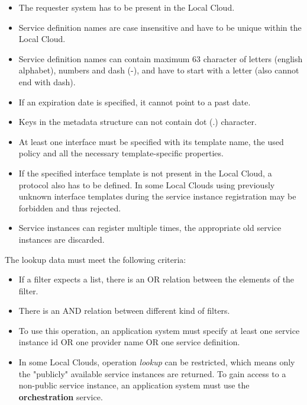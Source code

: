 \documentclass[a4paper]{arrowhead}
\begin{document}
\begin{itemize}
    \item The requester system has to be present in the Local Cloud.
    \item Service definition names are case insensitive and have to be unique within the Local Cloud.
    \item Service definition names can contain maximum 63 character of letters (english alphabet), numbers and dash (-), and have to start with a letter (also cannot end with dash).
    \item If an expiration date is specified, it cannot point to a past date.
    \item Keys in the metadata structure can not contain dot (.) character.
    \item At least one interface must be specified with its template name, the used policy and all the necessary template-specific properties.
    \item If the specified interface template is not present in the Local Cloud, a protocol also has to be defined. In some Local Clouds using previously unknown interface templates during the service instance registration may be forbidden and thus rejected.
    \item Service instances can register multiple times, the appropriate old service instances are discarded.
\end{itemize}


The lookup data must meet the following criteria:

\begin{itemize}
    \item If a filter expects a list, there is an OR relation between the elements of the filter.
    \item There is an AND relation between different kind of filters.
    \item To use this operation, an application system must specify at least one service instance id OR one provider name OR one service definition.
    \item In some Local Clouds, operation \textit{lookup} can be restricted, which means only the "publicly" available service instances are returned. To gain access to a non-public service instance, an application system must use the \textbf{orchestration} service.
\end{itemize}
\end{document}
